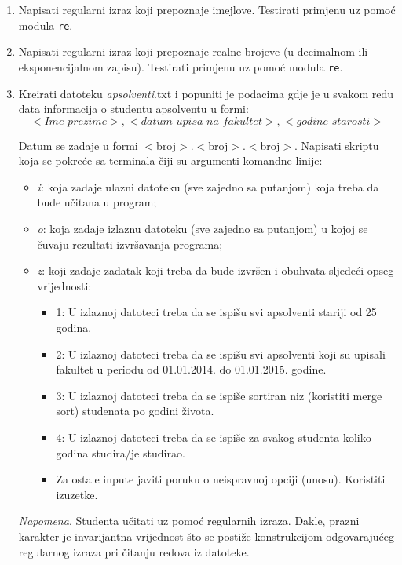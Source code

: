 \begin{enumerate}
	\item Napisati regularni izraz koji prepoznaje imejlove. Testirati primjenu uz pomoć modula \texttt{re}.
	
	\item Napisati regularni izraz koji prepoznaje realne brojeve (u decimalnom ili eksponencijalnom zapisu). Testirati primjenu uz pomoć modula \texttt{re}.
	
	
	\item Kreirati datoteku \textit{apsolventi}.txt i popuniti je podacima gdje je u svakom redu data
	informacija o studentu apsolventu u formi: 
	 $$<Ime\_prezime>, <datum\_upisa\_na\_fakultet>, <godine\_starosti>$$ 
	
	Datum se zadaje u formi $<$broj$>$.$<$broj$>$.$<$broj$>$. Napisati skriptu koja se pokreće sa terminala čiji su argumenti komandne linije:
	\begin{itemize}
		\item  	\textit{i}: koja zadaje ulazni datoteku (sve zajedno sa putanjom) koja treba da bude učitana u
	program;
	     \item \textit{o}: koja zadaje izlaznu datoteku (sve zajedno sa putanjom) u kojoj se čuvaju rezultati	izvršavanja programa;
	     \item  \textit{z}: koji zadaje zadatak koji treba da bude izvršen i obuhvata sljedeći opseg vrijednosti: 
	     \begin{itemize}
	     	\item  1: U izlaznoj datoteci treba da se ispišu svi apsolventi stariji od 25 godina.
             \item 2: U izlaznoj datoteci treba da se ispišu svi apsolventi koji su upisali fakultet u periodu od 01.01.2014. do 01.01.2015. godine.
	         \item 3: U izlaznoj datoteci treba da se ispiše sortiran niz (koristiti merge sort) studenata po godini života.
	         \item 4: U izlaznoj datoteci treba da se ispiše za svakog studenta koliko godina studira/je studirao.
	        \item Za ostale inpute javiti poruku o neispravnoj opciji (unosu). Koristiti izuzetke.
	         \end{itemize}
       \end{itemize}
	\textit{Napomena}. Studenta učitati uz pomoć regularnih izraza. Dakle, prazni karakter je
	invarijantna vrijednost što se postiže konstrukcijom odgovarajućeg regularnog izraza pri čitanju redova iz datoteke.
	

\end{enumerate}
